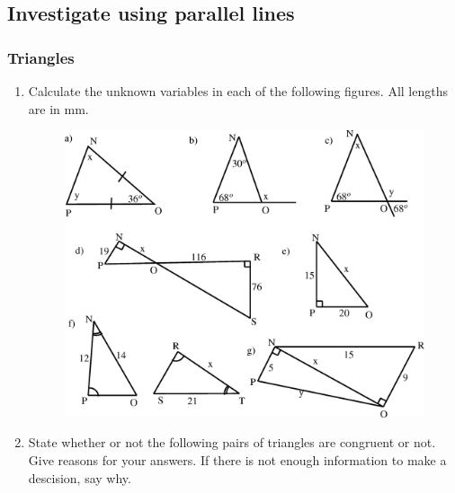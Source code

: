\subsection{Investigate using parallel lines
}
  \label{m39368*secfhsst!!!underscore!!!id824}
            \subsubsection{  Triangles }
            \nopagebreak
          \label{m39368*id318528}\begin{enumerate}[noitemsep, label=\textbf{\arabic*}. ] 
            \label{m39368*uid50}\item Calculate the unknown variables in each of the following figures. All
lengths are in mm.
    \setcounter{subfigure}{0}
	\begin{figure}[H] %
    \begin{center}
    \label{m39368*id318548!!!underscore!!!media}\label{m39368*id318548!!!underscore!!!printimage}\includegraphics{col11306.imgs/m39368_MG10C13_038.png} %
      \vspace{2pt}
    \vspace{.1in}
    \end{center}
 \end{figure}               \label{m39368*uid51}\item State whether or not the following pairs of triangles are congruent or not.
Give reasons for your answers. If there is not enough information to make a
descision, say why.

\end{enumerate}
